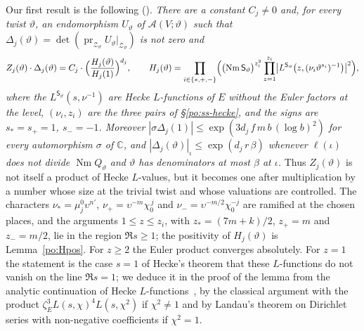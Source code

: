 \documentclass[10pt]{amsart}
\theoremstyle{definition}
\theoremstyle{remark}
\begin{document}
Our first result is the following ({\cite[Proposition~14.41]{P46}}). \emph{There are a constant
$C_j\ne0$ and, for every twist $\vartheta$, an endomorphism $U_\vartheta$ of
$\mathcal A(V;\vartheta)$ such that
$\Delta_j(\vartheta)=\det(\operatorname{pr}_{\mathcal Z_\vartheta}U_\vartheta|_{\mathcal Z_\vartheta})$
is not zero and
\[
Z_j(\vartheta)\cdot\Delta_j(\vartheta)=C_j\cdot\Bigl(\frac{H_j(\vartheta)}{H_j(1)}\Bigr)^{d_j},
\qquad
H_j(\vartheta)=\prod_{i\in\{\ast,+,-\}}\Bigl(\bigl(\operatorname{Nm}\mathsf S_\vartheta\bigr)^{z_i^2}
\prod_{z=1}^{z_i}\bigl|L^{\mathsf S_\vartheta}\bigl(z,(\nu_i\vartheta^{s_i})^{-1}\bigr)\bigr|^2\Bigr),
\]
where the $L^{\mathsf S_\vartheta}(s,\nu^{-1})$ are Hecke $L$-functions of $E$ without the Euler
factors at the level, $(\nu_i,z_i)$ are the three pairs of \S\ref{po:ss-hecke}, and the signs
are $s_\ast=s_+=1$, $s_-=-1$. Moreover
$|\sigma\Delta_j(1)|\le\exp(3d_j\,f\,m\,b\,(\log b)^2)$ for every automorphism $\sigma$ of
$\mathbb C$, and $|\Delta_j(\vartheta)|_\iota\le\exp(d_j\,r\,\beta)$ whenever $\ell(\iota)$ does
not divide $\operatorname{Nm}Q_\vartheta$ and $\vartheta$ has denominators at most $\beta$ at
$\iota$.} Thus $Z_j(\vartheta)$ is not itself a product of Hecke $L$-values, but it becomes one
after multiplication by a number whose size at the trivial twist and whose valuations are
controlled. The characters $\nu_\ast=\mu_j^0\upsilon^{n'}$, $\nu_+=\upsilon^{-m}\chi_0^{\,j}$ and
$\nu_-=\upsilon^{-m/2}\chi_0^{-j}$ are ramified at the chosen places, and the arguments
$1\le z\le z_i$, with $z_\ast=(7m+k)/2$, $z_+=m$ and $z_-=m/2$, lie in the region $\Re s\ge1$;
the positivity of $H_j(\vartheta)$ is Lemma~\ref{po:Hpos}. For $z\ge2$ the Euler product converges
absolutely. For $z=1$ the statement is the case $s=1$ of Hecke's theorem that these $L$-functions
do not vanish on the line $\Re s=1$; we deduce it in the proof of the lemma from the analytic
continuation of Hecke $L$-functions~\cite{Hecke1920}, by the classical argument with the product
$\zeta_E^3L(s,\chi)^4L(s,\chi^2)$ if $\chi^2\ne1$ and by Landau's theorem on Dirichlet series
with non-negative coefficients if $\chi^2=1$.
\end{document}
